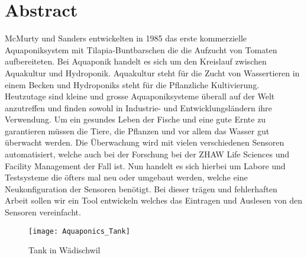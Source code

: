 \documentclass[../main.tex]{subfiles}
\begin{document}
	
		
	\section*{Abstract}
	McMurty und Sanders entwickelten in 1985 das erste kommerzielle Aquaponiksystem mit Tilapia-Buntbarschen die die Aufzucht von Tomaten aufbereiteten. Bei Aquaponik handelt es sich um den Kreislauf zwischen Aquakultur und Hydroponik. Aquakultur steht für die Zucht von Wassertieren in einem Becken und Hydroponiks steht für die Pflanzliche Kultivierung. Heutzutage sind kleine und grosse Aquaponiksysteme überall auf der Welt anzutreffen und finden sowohl in Industrie- und Entwicklungsländern ihre Verwendung. Um ein gesundes Leben der Fische und eine gute Ernte zu garantieren müssen die Tiere, die Pflanzen und vor allem das Wasser gut überwacht werden. Die Überwachung wird mit vielen verschiedenen Sensoren automatisiert, welche auch bei der Forschung bei der ZHAW Life Sciences und Facility Management der Fall ist. Nun handelt es sich hierbei um Labore und Testsysteme die öfters mal neu oder umgebaut werden, welche eine Neukonfiguration der Sensoren benötigt. Bei dieser trägen und fehlerhaften Arbeit sollen wir ein Tool entwickeln welches das Eintragen und Auslesen von den Sensoren vereinfacht.\\
	
	\begin{figure}[H]
		\centering
		\texttt{[image: Aquaponics\_Tank]}
		\caption{Tank in Wädischwil}
		\label{fig:Aquaponics_Tank}
	\end{figure}
	\par \noindent
	
\end{document}
